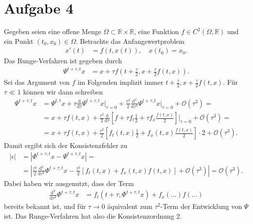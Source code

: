 \documentclass[english, parskip=full]{scrartcl}
\newcommand{\kla}{}
\newcommand{\klam}{}
\newcommand{\tecxt}{}
\begin{document}
\section*{Aufgabe 4}
Gegeben seien eine offene Menge $\Omega\subset \mathbb{R}\times \mathbb{R}$, eine Funktion $f\in C^2(\Omega,\mathbb{R})$ und ein Punkt $(t_0,x_0)\in\Omega$.
Betrachte das Anfangswertproblem
\begin{align}
x'(t) &= f(t,x(t)), \quad x(t_0) = x_0.
\end{align}
Das Runge-Verfahren ist gegeben durch
\begin{align}
\Psi^{t+\tau,t} x &= x + \tau f\kla\left( t + \frac{\tau}{2}, x + \frac{\tau}{2} f(t,x) \right).
\end{align}
Sei das Argument von $f$ im Folgenden implizit immer $t + \frac{\tau}{2}, x + \frac{\tau}{2} f(t,x)$.
Für $\tau\ll 1$ können wir dann schreiben
\begin{align}
\Psi^{t+\tau,t} x &= \Psi^{t,t} x + \tau \frac{\tecxt\text{d}}{\tecxt\text{d}\tau} \Psi^{t+\tau,t} x \bigg\vert_{\tau=0} + \frac{\tau^2}{2} \frac{\tecxt\text{d}^2}{\tecxt\text{d}\tau^2} \Psi^{t+\tau,t}x \bigg\vert_{\tau=0} + \mathcal{O}(\tau^3) = \\
&= x + \tau f(t,x) + \frac{\tau^2}{2} \frac{\tecxt\text{d}}{\tecxt\text{d}\tau} \klam\left[ f + \tau f_t \frac{1}{2} + \tau f_x \frac{f(t,x)}{2} \right] \bigg\vert_{\tau=0} + \mathcal{O}(\tau^3) = \\
&= x + \tau f(t,x) + \frac{\tau^2}{2} \klam\left[ f_t(t,x) \frac{1}{2} + f_x(t,x) \frac{f(t,x)}{2} \right] \cdot 2 + \mathcal{O}(\tau^3).
\end{align}
Damit ergibt sich der Konsistenzfehler zu
\begin{align}
|\epsilon| &= \left\vert \Phi^{t+\tau,t}x - \Psi^{t+\tau,t}x \right\vert = \\
&= \left\vert \frac{\tau^2}{2} \frac{\tecxt\text{d}^2}{\tecxt\text{d}\tau^2} \Phi^{t+\tau,t}x - \frac{\tau^2}{2} \klam\left[ f_t(t,x) + f_x(t,x) f(t,x) \right] + \mathcal{O}(\tau^3) \right\vert = \mathcal{O}(\tau^3).
\end{align}
Dabei haben wir ausgenutzt, dass der Term
\begin{align}
\frac{\tecxt\text{d}^2}{\tecxt\text{d}\tau^2} \Phi^{t+\tau,t}x &= f_t\kla\left( t + \tau, \Phi^{t+\tau,t}x \right) + f_x(\dots) f(\dots)
\end{align}
bereits bekannt ist, und für $\tau\rightarrow 0$ äquivalent zum $\tau^2$-Term der Entwicklung von $\Psi$ ist.
Das Runge-Verfahren hat also die Konsistenzordnung 2.


\end{document}
